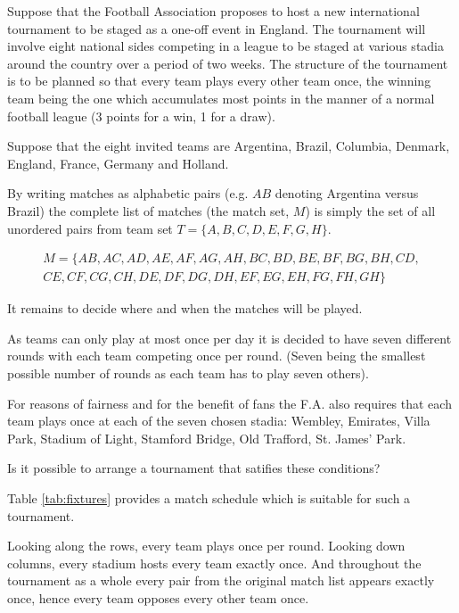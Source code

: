 \begin{example}
\label{eg:tournament}
Suppose that the Football Association proposes to host a new international tournament to be staged as a one-off event in England.
The tournament will involve eight national sides competing in a league to be staged at various stadia around the country over a period of two weeks.
The structure of the tournament is to be planned so that every team plays every other team once, the winning team being the one which accumulates most points in the manner of a normal football league (3 points for a win, 1 for a draw).

Suppose that the eight invited teams are Argentina, Brazil, Columbia, Denmark, England, France, Germany and Holland.

By writing matches as alphabetic pairs (e.g. $AB$ denoting Argentina versus Brazil) the complete list of matches (the match set, $M$) is simply the set of all unordered pairs from team set $T = \{A, B, C, D, E, F, G, H\}$.

\begin{equation*}
  \begin{split}
    M = \{
      AB, AC, AD, AE, AF, AG, AH, BC, BD, BE, BF, BG, BH, CD, \\
      CE, CF, CG, CH, DE, DF, DG, DH, EF, EG, EH, FG, FH, GH
    \}
  \end{split}
\end{equation*}

It remains to decide where and when the matches will be played.

As teams can only play at most once per day it is decided to have seven different rounds with each team competing once per round.
(Seven being the smallest possible number of rounds as each team has to play seven others).

For reasons of fairness and for the benefit of fans the F.A. also requires that each team plays once at each of the seven chosen stadia: Wembley, Emirates, Villa Park, Stadium of Light, Stamford Bridge, Old Trafford, St. James' Park.

Is it possible to arrange a tournament that satifies these conditions?

Table \ref{tab:fixtures} provides a match schedule which is suitable for such a tournament.

Looking along the rows, every team plays once per round.
Looking down columns, every stadium hosts every team exactly once.
And throughout the tournament as a whole every pair from the original match list appears exactly once, hence every team opposes every other team once.
\label{eg:football}
\end{example}

